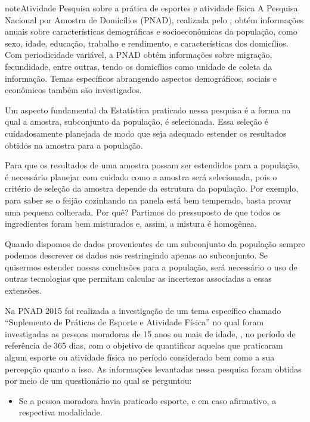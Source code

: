 \begin{sphinxadmonition}{note}{Atividade}{ Pesquisa sobre a prática de esportes e atividade física}
A Pesquisa Nacional por Amostra de Domicílios (PNAD), realizada pelo , obtém informações anuais sobre características demográficas e socioeconômicas da população, como sexo, idade, educação, trabalho e rendimento, e características dos domicílios. Com periodicidade variável, a PNAD obtém informações sobre migração, fecundidade, entre outras, tendo os domicílios como unidade de coleta da informação. Temas específicos abrangendo aspectos demográficos, sociais e econômicos também são investigados.

Um aspecto fundamental da Estatística praticado nessa pesquisa é a forma na qual a amostra, subconjunto da população, é selecionada. Essa seleção é cuidadosamente planejada de modo que seja adequado estender os resultados obtidos na amostra para a população.

Para que os resultados de uma amostra possam ser estendidos para a população, é necessário planejar com cuidado como a amostra será selecionada, pois o critério de seleção da amostra depende da estrutura da população. Por exemplo, para saber se o feijão cozinhando na panela está bem temperado, basta provar uma pequena colherada. Por quê?  Partimos do pressuposto de que todos os ingredientes foram bem misturados e, assim, a mistura é homogênea.

Quando dispomos de dados provenientes de um subconjunto da população sempre podemos descrever os dados nos restringindo apenas ao subconjunto. Se quisermos estender nossas conclusões para a população, será necessário o uso de outras tecnologias que permitam calcular as incertezas associadas a essas extensões.

Na PNAD 2015 foi realizada a investigação de um tema específico chamado ``Suplemento de Práticas de Esporte e Atividade Física'' no qual foram investigadas as pessoas moradoras de 15 anos ou mais de idade, , no período de referência de 365 dias, com o objetivo de quantificar aquelas que praticaram algum esporte ou atividade física no período considerado bem como a sua percepção quanto a isso. As informações levantadas nessa pesquisa foram obtidas por meio de um questionário no qual se perguntou:
\begin{itemize}
\item {} 
Se a pessoa moradora havia praticado esporte, e em caso afirmativo, a respectiva modalidade.


\end{itemize}
\end{sphinxadmonition}

